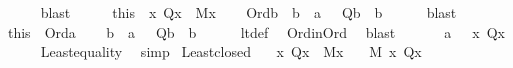 \begin{isabellebody}
\ \ \ \ \isamarkupfalse%
\ blast{\isacharplus}{\kern0pt}\isanewline
\ \ \isamarkupfalse%
\ \isamarkupfalse%
\ this\ \ {\isacartoucheopen}{\isasymAnd}x{\isachardot}{\kern0pt}\ Q{\isacharparenleft}{\kern0pt}x{\isacharparenright}{\kern0pt}\ {\isasymLongrightarrow}\ M{\isacharparenleft}{\kern0pt}x{\isacharparenright}{\kern0pt}{\isacartoucheclose}\isanewline
\ \ \isamarkupfalse%
\ {\isachardoublequoteopen}Ord{\isacharparenleft}{\kern0pt}b{\isacharparenright}{\kern0pt}\ {\isasymLongrightarrow}\ b\ {\isasymin}\ a\ {\isasymLongrightarrow}\ {\isasymnot}\ Q{\isacharparenleft}{\kern0pt}b{\isacharparenright}{\kern0pt}{\isachardoublequoteclose}\ \ b\isanewline
\ \ \ \ \isamarkupfalse%
\ blast\isanewline
\ \ \isamarkupfalse%
\ \isamarkupfalse%
\ this\ \ {\isacartoucheopen}Ord{\isacharparenleft}{\kern0pt}a{\isacharparenright}{\kern0pt}{\isacartoucheclose}\isanewline
\ \ \isamarkupfalse%
\ {\isachardoublequoteopen}b\ {\isacharless}{\kern0pt}\ a\ {\isasymLongrightarrow}\ {\isasymnot}\ Q{\isacharparenleft}{\kern0pt}b{\isacharparenright}{\kern0pt}{\isachardoublequoteclose}\ \ b\isanewline
\ \ \ \ \isamarkupfalse%
\ lt{\isacharunderscore}{\kern0pt}def\ \isamarkupfalse%
\ Ord{\isacharunderscore}{\kern0pt}in{\isacharunderscore}{\kern0pt}Ord\ \isamarkupfalse%
\ blast\isanewline
\ \ \isamarkupfalse%
\isanewline
\ \ \isamarkupfalse%
\ {\isachardoublequoteopen}a\ {\isacharequal}{\kern0pt}\ {\isacharparenleft}{\kern0pt}{\isasymmu}\ x{\isachardot}{\kern0pt}\ Q{\isacharparenleft}{\kern0pt}x{\isacharparenright}{\kern0pt}{\isacharparenright}{\kern0pt}{\isachardoublequoteclose}\isanewline
\ \ \ \ \isamarkupfalse%
\ Least{\isacharunderscore}{\kern0pt}equality\ \isamarkupfalse%
\ simp\isanewline
{}\isamarkupfalse%
%
\endisatagproof
{\isafoldproof}%
%
\isadelimproof
\isanewline
%
\endisadelimproof
\isanewline
{}\isamarkupfalse%
\ Least{\isacharunderscore}{\kern0pt}closed{\isacharcolon}{\kern0pt}\isanewline
\ \ \ {\isachardoublequoteopen}{\isasymAnd}x{\isachardot}{\kern0pt}\ Q{\isacharparenleft}{\kern0pt}x{\isacharparenright}{\kern0pt}\ {\isasymLongrightarrow}\ M{\isacharparenleft}{\kern0pt}x{\isacharparenright}{\kern0pt}{\isachardoublequoteclose}\isanewline
\ \ \ {\isachardoublequoteopen}M{\isacharparenleft}{\kern0pt}{\isasymmu}\ x{\isachardot}{\kern0pt}\ Q{\isacharparenleft}{\kern0pt}x{\isacharparenright}{\kern0pt}{\isacharparenright}{\kern0pt}{\isachardoublequoteclose}\isanewline

\end{isabellebody}
